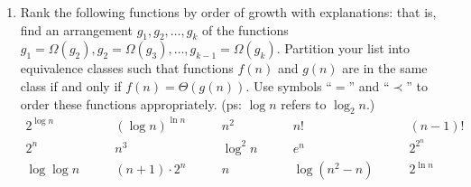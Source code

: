 \documentclass{article}
\newtheorem*{solution}{Solution}
\begin{document}
\begin{enumerate}
~\\
\begin{solution}
  $\mathbb{E}T(1) = 0; n\geq2\rightarrow \mathbb{E}T(n) = n + \dfrac{1}{n}\left(\sum_{i=1}^{n} \left[\mathbb{E}T(i-1) + \mathbb{E}T(n-i)\right]\right)=n+\dfrac{2}{n}\sum_{i=1}^{n-1}\mathbb{E}T(i)$.\\
  When $n$ is big enough, 
  $$
  \begin{array}{rl}
    n+\dfrac{2}{n}\sum_{i=1}^{n-1}2i\ln i&=n+2\sum_{i=1}^{n-1}\dfrac{2i}{n}\left(\ln{\dfrac{i}{n}}+\ln n\right)\\
     &=n+4n\sum_{i=1}^{n-1} \dfrac{i}{n^2}\ln\dfrac{i}{n} + \dfrac{4\ln n}{n}\sum_{i=1}^{n-1} i\\
     &\approx n + 4n\int_{0}^1 x\ln x\ \mathtt{d}x+\dfrac{4\ln n}{n}\cdot\dfrac{n^2}{2}\\
     &=n+4n\cdot(-\dfrac{1}{4})+2n\ln n = 2n\ln n
  \end{array}
  $$
  So, there is reason to believe that when $n$ is big enough $\mathbb{E}T(n)\approx 2n\ln n$ and $\mathbb{E}T(n)=\Theta(n\log n)$ 
  ~\\
  Discussing with classmates, I get a better solution:\\
  $\mathbb{E}T(n)=n+\dfrac{2}{n}\sum_{i=1}^{n-1}\mathbb{E}T(i)\Rightarrow n\mathbb{E}T(n)=n^2+2\sum_{i=1}^{n-1}\mathbb{E}T(i)$ (1)\\
  and $(n+1)\mathbb{E}T(n+1)=(n+1)^2+2\sum_{i=1}^n\mathbb{E}T(i)$ (2). Therefore, (2)-(1): $\dfrac{\mathbb{E}T(n+1)-1}{n+2}=\dfrac{\mathbb{E}T(n)-1}{n+1}+\dfrac{2}{n+2}$
  Therefore, $\dfrac{\mathbb{E}T(n+1)-1}{n+2}\sim 2\ln (n+1)\Rightarrow \mathbb{E}T(n)\sim 2n\ln n\Rightarrow \mathbb{E}T(n)=\Theta(n\log n)$.
\end{solution}
~\\

\item Rank the following functions by order of growth with explanations: that is, find an arrangement $g_1, g_2, \ldots , g_{k}$ of the functions $g_1 = \Omega(g_2), g_2 = \Omega(g_3), \ldots, g_{k-1} = \Omega(g_{k})$.  Partition your list into equivalence classes such that functions $f(n)$ and $g(n)$ are in the same class if and only if $f(n) = \Theta(g(n))$. Use symbols ``$=$'' and ``$\prec$'' to order these functions appropriately. (ps: $\log n$ refers to $\log_2 n$.)
    $$
    \begin{array}{ccccc}
        2^{\log n} \quad & \quad (\log n)^{\ln n} \quad & \quad n^2 \quad & \quad n! \quad & \quad (n - 1)! \\
        2^n \quad & \quad n^3 \quad & \quad \log^2 n \quad & \quad e^n \quad & \quad 2^{2^n} \\
        \log\log n \quad & \quad (n+1)\cdot 2^n \quad & \quad n \quad & \quad \log {(n^2 - n)} \quad & \quad 2^{\ln n} \\
    \end{array}
    $$
    

\end{enumerate}
\end{document}
